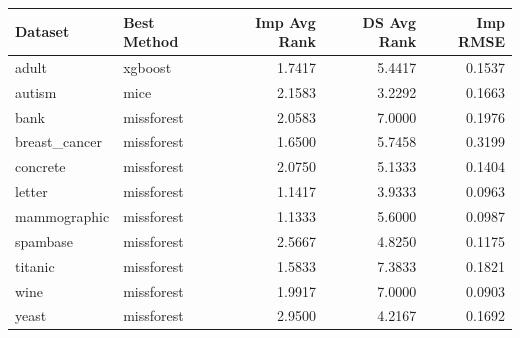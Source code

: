 \begin{tabular}{llrrr}
\toprule
Dataset & Best Method & Imp Avg Rank & DS Avg Rank & Imp RMSE \\
\midrule
adult & xgboost & 1.7417 & 5.4417 & 0.1537 \\
autism & mice & 2.1583 & 3.2292 & 0.1663 \\
bank & missforest & 2.0583 & 7.0000 & 0.1976 \\
breast\_cancer & missforest & 1.6500 & 5.7458 & 0.3199 \\
concrete & missforest & 2.0750 & 5.1333 & 0.1404 \\
letter & missforest & 1.1417 & 3.9333 & 0.0963 \\
mammographic & missforest & 1.1333 & 5.6000 & 0.0987 \\
spambase & missforest & 2.5667 & 4.8250 & 0.1175 \\
titanic & missforest & 1.5833 & 7.3833 & 0.1821 \\
wine & missforest & 1.9917 & 7.0000 & 0.0903 \\
yeast & missforest & 2.9500 & 4.2167 & 0.1692 \\
\bottomrule
\end{tabular}
